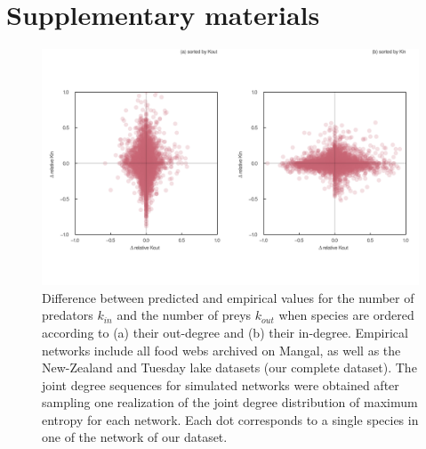 \documentclass[
  12pt,
]{article}
\author{}
\date{}
\begin{document}
\hypertarget{supplementary-materials}{%
\section{Supplementary materials}\label{supplementary-materials}}

\begin{figure}
\hypertarget{fig:kin_kout_diff}{%
\centering
\includegraphics{figures/kin_kout_difference.png}
\caption{Difference between predicted and empirical values for the
number of predators \(k_{in}\) and the number of preys \(k_{out}\) when
species are ordered according to (a) their out-degree and (b) their
in-degree. Empirical networks include all food webs archived on Mangal,
as well as the New-Zealand and Tuesday lake datasets (our complete
dataset). The joint degree sequences for simulated networks were
obtained after sampling one realization of the joint degree distribution
of maximum entropy for each network. Each dot corresponds to a single
species in one of the network of our dataset.}\label{fig:kin_kout_diff}
}
\end{figure}
\end{document}
